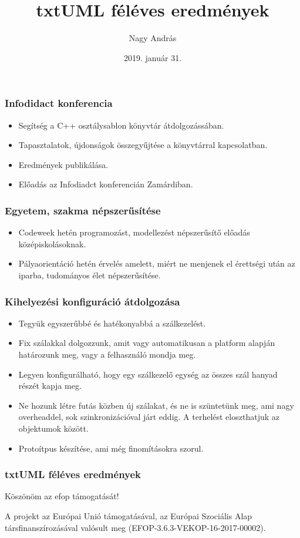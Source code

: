 \documentclass[11pt]{beamer}
\author{Nagy András}
\title{txtUML féléves eredmények}
\date{2019. január 31.}
\begin{document}
\begin{frame}
\titlepage
\end{frame}


\begin{frame}
	\frametitle{Infodidact konferencia}
	\begin{itemize}
		\item Segítség a C++ osztálysablon könyvtár átdolgozássában.
		\item Tapasztalatok, újdonságok összegyűjtése a könyvtárral kapcsolatban.
		\item Eredmények publikálása.
		\item Előadás az Infodiadct konferencián Zamárdiban.
	\end{itemize}
\end{frame}

\begin{frame}
	\frametitle{Egyetem, szakma népszerűsítése}
	\begin{itemize}
		\item Codeweek hetén programozást, modellezést népszerűsítő előadás középiskolásoknak.
		\item Pályaorientáció hetén érvelés amelett, miért ne menjenek el érettségi után az iparba, tudományos élet népszerűsítése.
	\end{itemize}
\end{frame}

\begin{frame}
	\frametitle{Kihelyezési konfiguráció átdolgozása}
	\begin{itemize}
		\item Tegyük egyszerűbbé és hatékonyabbá a szálkezelést.
		\item Fix szálakkal dolgozzunk, amit vagy automatikusan a platform alapján határozunk meg, vagy a felhasználó mondja meg.
		\item Legyen konfigurálható, hogy egy szálkezelő egység az összes szál hanyad részét kapja meg.
		\item Ne hozunk létre futás közben új szálakat, és ne is szüntetünk meg, ami nagy overheaddel, sok szinkronizációval járt eddig. A terhelést eloszthatjuk az objektumok között.
		\item Protoítpus készítése, ami még finomításokra szorul.
	\end{itemize}
\end{frame}

\begin{frame}
	\frametitle{txtUML féléves eredmények}
	\begin{center}
		\Large{Köszönöm az efop támogatását!}
	
	\vspace*{25px}
	{\small A projekt az Európai Unió támogatásával, az Európai Szociális Alap társfinanszírozásával valósult meg (EFOP-3.6.3-VEKOP-16-2017-00002).}\end{center}
\end{frame}
\end{document}
